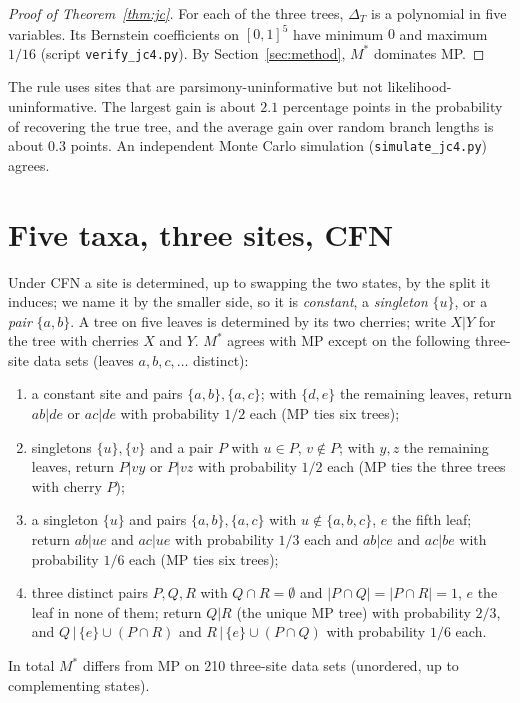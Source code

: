 \documentclass[11pt]{amsart}
\theoremstyle{definition}
\theoremstyle{remark}
\begin{document}
\begin{proof}[Proof of Theorem~\ref{thm:jc}]
For each of the three trees, $\Delta_T$ is a polynomial in five variables. Its Bernstein coefficients on $[0,1]^5$ have minimum $0$ and maximum $1/16$ (script \texttt{verify\_jc4.py}). By Section~\ref{sec:method}, $M^\ast$ dominates MP.
\end{proof}

The rule uses sites that are parsimony-uninformative but not likelihood-uninformative. The largest gain is about $2.1$ percentage points in the probability of recovering the true tree, and the average gain over random branch lengths is about $0.3$ points. An independent Monte Carlo simulation (\texttt{simulate\_jc4.py}) agrees.

\section{Five taxa, three sites, CFN}\label{sec:cfn}

Under CFN a site is determined, up to swapping the two states, by the split it induces; we name it by the smaller side, so it is \emph{constant}, a \emph{singleton} $\{u\}$, or a \emph{pair} $\{a,b\}$. A tree on five leaves is determined by its two cherries; write $X|Y$ for the tree with cherries $X$ and $Y$. $M^\ast$ agrees with MP except on the following three-site data sets (leaves $a,b,c,\dots$ distinct):
\begin{enumerate}
\item[(A)] a constant site and pairs $\{a,b\},\{a,c\}$; with $\{d,e\}$ the remaining leaves, return $ab|de$ or $ac|de$ with probability $1/2$ each (MP ties six trees);
\item[(B)] singletons $\{u\},\{v\}$ and a pair $P$ with $u\in P$, $v\notin P$; with $y,z$ the remaining leaves, return $P|vy$ or $P|vz$ with probability $1/2$ each (MP ties the three trees with cherry $P$);
\item[(C)] a singleton $\{u\}$ and pairs $\{a,b\},\{a,c\}$ with $u\notin\{a,b,c\}$, $e$ the fifth leaf; return $ab|ue$ and $ac|ue$ with probability $1/3$ each and $ab|ce$ and $ac|be$ with probability $1/6$ each (MP ties six trees);
\item[(D)] three distinct pairs $P,Q,R$ with $Q\cap R=\emptyset$ and $|P\cap Q|=|P\cap R|=1$, $e$ the leaf in none of them; return $Q|R$ (the unique MP tree) with probability $2/3$, and $Q\,|\,\{e\}\cup(P\cap R)$ and $R\,|\,\{e\}\cup(P\cap Q)$ with probability $1/6$ each.
\end{enumerate}
In total $M^\ast$ differs from MP on 210 three-site data sets (unordered, up to complementing states).
\end{document}
